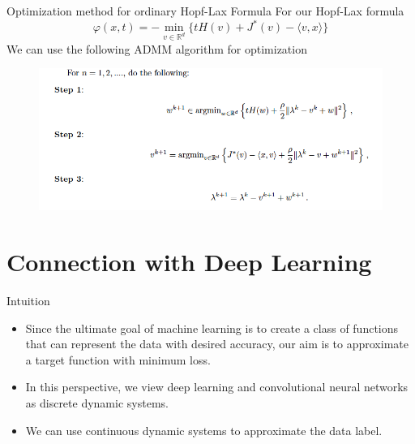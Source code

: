 \documentclass[english]{pkuslide}
\begin{document}
\begin{frame}{Optimization method for ordinary Hopf-Lax Formula}
For our Hopf-Lax formula 
 \begin{equation}
\varphi(x,t) = -\min_{v \in \mathbb{R}^{d}}\{tH(v)+J^{*}(v)-\langle v,x \rangle\}
\end{equation}
We can use the following ADMM algorithm for optimization
\begin{figure}
\centering
\includegraphics[height=0.5\textheight]{9.png}
\end{figure}

\end{frame}
\section{Connection with Deep Learning}

	\frame{\sectionpage}

	\begin{frame}{Intuition}
\nocite{*} 
\begin{itemize}
\item Since the ultimate goal of machine learning is to create a class of functions that can represent the data with desired accuracy, our aim is to approximate a target function with minimum loss. 
\item In this perspective, we view deep learning and convolutional neural networks as discrete dynamic systems.
\item We can use continuous dynamic systems to approximate the data label.
\end{itemize}
	\end{frame}
\end{document}
